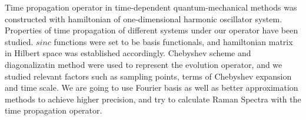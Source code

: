 
Time propagation operator in time-dependent quantum-mechanical methods was constructed with hamiltonian of one-dimensional harmonic oscillator system. Properties of time propagation of different systems under our operator have been studied. $sinc$ functions were set to be basis functionals, and hamiltonian matrix in Hilbert space was established accordingly. Chebyshev scheme and diagonalizatin method were used to represent the evolution operator, and we studied relevant factors such as sampling points, terms of Chebyshev expansion and time scale. We are going to use Fourier basis as well as better approximation methods to achieve higher precision, and try to calculate Raman Spectra with the time propagation operator. 

\bigskip
